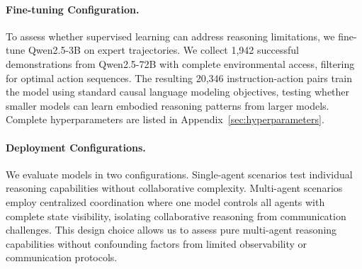 \paragraph{Fine-tuning Configuration.}
To assess whether supervised learning can address reasoning limitations, we fine-tune Qwen2.5-3B on expert trajectories. We collect 1,942 successful demonstrations from Qwen2.5-72B with complete environmental access, filtering for optimal action sequences. The resulting 20,346 instruction-action pairs train the model using standard causal language modeling objectives, testing whether smaller models can learn embodied reasoning patterns from larger models. Complete hyperparameters are listed in Appendix~\ref{sec:hyperparameters}.

\paragraph{Deployment Configurations.}
We evaluate models in two configurations. Single-agent scenarios test individual reasoning capabilities without collaborative complexity. Multi-agent scenarios employ centralized coordination where one model controls all agents with complete state visibility, isolating collaborative reasoning from communication challenges. This design choice allows us to assess pure multi-agent reasoning capabilities without confounding factors from limited observability or communication protocols.

